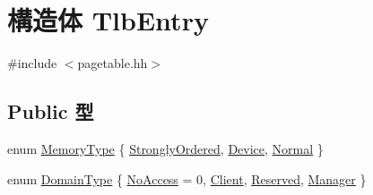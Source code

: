 \hypertarget{structArmISA_1_1TlbEntry}{
\section{構造体 TlbEntry}
\label{structArmISA_1_1TlbEntry}
}


{\ttfamily \#include $<$pagetable.hh$>$}\subsection*{Public 型}
\begin{DoxyCompactItemize}
\item 
enum \hyperlink{structArmISA_1_1TlbEntry_a462bfa9dfea81692463ecb192183dd01}{MemoryType} \{ \hyperlink{structArmISA_1_1TlbEntry_a462bfa9dfea81692463ecb192183dd01a1bc18c2c2c64f706bc4ed7bb4b236035}{StronglyOrdered}, 
\hyperlink{structArmISA_1_1TlbEntry_a462bfa9dfea81692463ecb192183dd01ab9959e3ca6217e02e152d8ce68ec463c}{Device}, 
\hyperlink{structArmISA_1_1TlbEntry_a462bfa9dfea81692463ecb192183dd01a5ecbcf0afce98b042f35ec71ba03fa4b}{Normal}
 \}
\item 
enum \hyperlink{structArmISA_1_1TlbEntry_a0595b41cfb7d03f18438f9c355a3469d}{DomainType} \{ \hyperlink{structArmISA_1_1TlbEntry_a0595b41cfb7d03f18438f9c355a3469dad28072d99d72bf44bbab1fca26983437}{NoAccess} =  0, 
\hyperlink{structArmISA_1_1TlbEntry_a0595b41cfb7d03f18438f9c355a3469dae5d09f815b2438dc14af448d00837cc8}{Client}, 
\hyperlink{structArmISA_1_1TlbEntry_a0595b41cfb7d03f18438f9c355a3469da6136a0872216f91100b42ea04333af70}{Reserved}, 
\hyperlink{structArmISA_1_1TlbEntry_a0595b41cfb7d03f18438f9c355a3469da999035b42533807bd5771d1beec34485}{Manager}
 \}
\end{DoxyCompactItemize}
